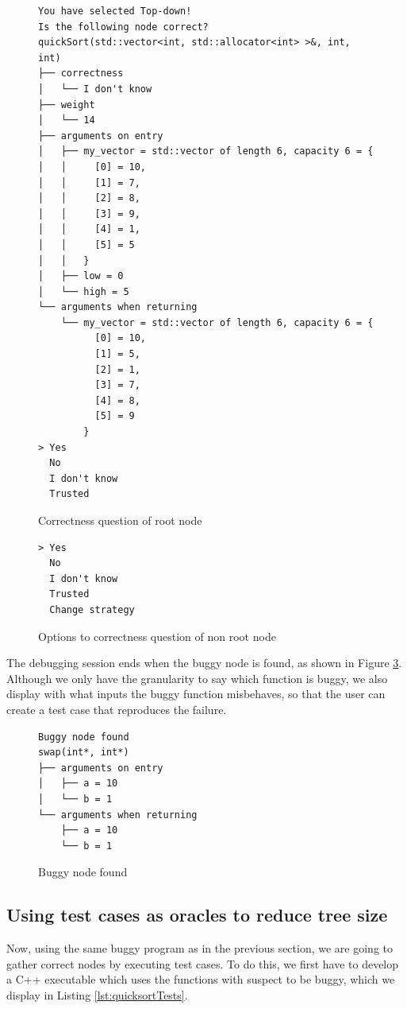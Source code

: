 \begin{figure}
    \centering
    \caption{Correctness question of root node}
    \label{fig:correctnessQuestion}
    \begin{verbatim}
You have selected Top-down!
Is the following node correct?
quickSort(std::vector<int, std::allocator<int> >&, int, int)
├── correctness
│   └── I don't know
├── weight
│   └── 14
├── arguments on entry
│   ├── my_vector = std::vector of length 6, capacity 6 = {
│   │     [0] = 10,
│   │     [1] = 7,
│   │     [2] = 8,
│   │     [3] = 9,
│   │     [4] = 1,
│   │     [5] = 5
│   │   }
│   ├── low = 0
│   └── high = 5
└── arguments when returning
    └── my_vector = std::vector of length 6, capacity 6 = {
          [0] = 10,
          [1] = 5,
          [2] = 1,
          [3] = 7,
          [4] = 8,
          [5] = 9
        }
> Yes
  No
  I don't know
  Trusted
    \end{verbatim}
\end{figure}

\begin{figure}
    \centering
    \caption{Options to correctness question of non root node}
    \label{fig:correctnessQuestionNonRootOptions}
    \begin{verbatim}
> Yes
  No
  I don't know
  Trusted
  Change strategy
    \end{verbatim}
\end{figure}

The debugging session ends when the buggy node is found, as shown in Figure \ref{fig:buggyNodeFound}. Although we only have the granularity to say which function is buggy, we also display with what inputs the buggy function misbehaves, so that the user can create a test case that reproduces the failure.

\begin{figure}
    \centering
    \caption{Buggy node found}
    \label{fig:buggyNodeFound}
    \begin{verbatim}
Buggy node found
swap(int*, int*)
├── arguments on entry
│   ├── a = 10
│   └── b = 1
└── arguments when returning
    ├── a = 10
    └── b = 1
    \end{verbatim}
\end{figure}
\subsection{Using test cases as oracles to reduce tree size}
Now, using the same buggy program as in the previous section, we are going to gather correct nodes by executing test cases.
To do this, we first have to develop a C++ executable which uses the functions with suspect to be buggy, which we display in Listing \ref{lst:quicksortTests}.

